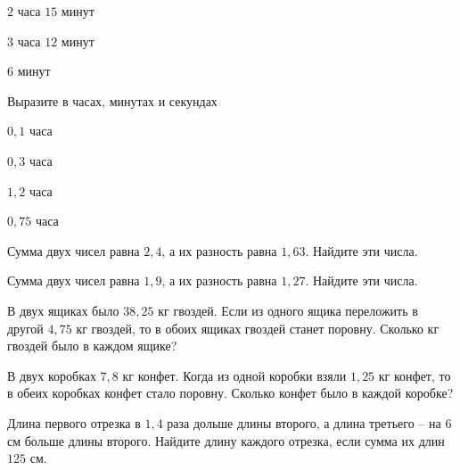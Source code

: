 \begin{class}[number=5]
\begin{listofex}
\begin{enumcols}[itemcolumns=4]
			\item \(2\) часа \(15\) минут
			\item \(3\) часа \(12\) минут
			\item \(6\) минут
		\end{enumcols}
		\item Выразите в часах, минутах и секундах
		\begin{enumcols}[itemcolumns=4]
			\item \(0,1\) часа
			\item \(0,3\) часа
			\item \(1,2\) часа
			\item \(0,75\) часа
		\end{enumcols}
		\item Сумма двух чисел равна \(2,4\), а их разность равна \(1,63\). Найдите эти числа.
		\item Сумма двух чисел равна \(1,9\), а их разность равна \(1,27\). Найдите эти числа.
		\item В двух ящиках было \(38,25\) кг гвоздей. Если из одного ящика переложить в другой \(4,75\) кг гвоздей, то в обоих ящиках гвоздей станет поровну. Сколько кг гвоздей было в каждом ящике?
		\item В двух коробках \(7,8\) кг конфет. Когда из одной коробки взяли \(1,25\) кг конфет, то в обеих коробках конфет стало поровну. Сколько конфет было в каждой коробке?
		\item Длина первого отрезка в \(1,4\) раза дольше длины второго, а длина третьего – на \(6\) см больше длины второго. Найдите длину каждого отрезка, если сумма их длин \(125\) см.
	\end{listofex}
\end{class}
%
%
%
%	
%
%
%	
%
%
%	
